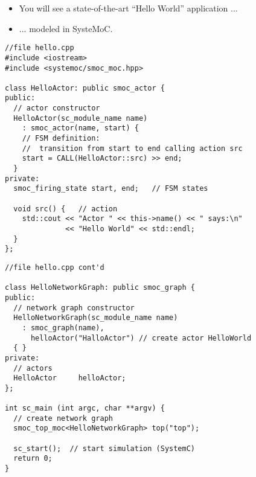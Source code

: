 \begin{frame}
\begin{itemize}
\item You will see a state-of-the-art ``Hello World'' application ...
\item ...  modeled in SysteMoC.
\end{itemize}
\end{frame}




\begin{frame}[fragile=singleslide]
\begin{lstlisting}
//file hello.cpp
#include <iostream>
#include <systemoc/smoc_moc.hpp>

class HelloActor: public smoc_actor {
public:
  // actor constructor
  HelloActor(sc_module_name name)
    : smoc_actor(name, start) {
    // FSM definition:
    //  transition from start to end calling action src
    start = CALL(HelloActor::src) >> end;
  }
private:
  smoc_firing_state start, end;   // FSM states

  void src() {   // action
    std::cout << "Actor " << this->name() << " says:\n"
              << "Hello World" << std::endl;
  }
};
\end{lstlisting}
\end{frame}

\begin{frame}[fragile=singleslide]
\begin{lstlisting}
//file hello.cpp cont'd

class HelloNetworkGraph: public smoc_graph {
public:
  // network graph constructor
  HelloNetworkGraph(sc_module_name name)
    : smoc_graph(name),
      helloActor("HalloActor") // create actor HelloWorld
  { }
private:
  // actors
  HelloActor     helloActor;
};

int sc_main (int argc, char **argv) {
  // create network graph
  smoc_top_moc<HelloNetworkGraph> top("top");

  sc_start();  // start simulation (SystemC)
  return 0;
}
\end{lstlisting}
\end{frame}

